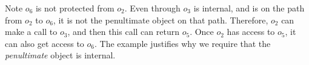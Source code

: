  

Note   $o_6$ is not protected from $o_2$. 
Even through $o_3$ is internal, and is on the path %
 from $o_2$ to $o_6$, %
it is not the penultimate object on that path. Therefore,  $o_2$ can make a call to $o_3$, and then this call can  return $o_5$. Once $o_2$ has access to $o_5$, it can also get access to $o_6$. 
The example justifies why we require that the \emph{penultimate} object is internal.



 
 
